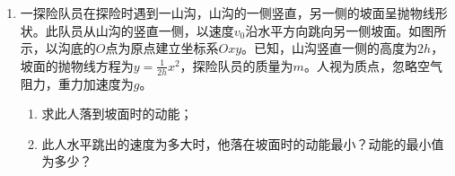 \documentclass[\gkver]{gaokaozhenti}
\begin{document}
\begin{enumerate}
{摆长为 $L$ 的单摆在地面处的摆动周期为 $T=2\pi\sqrt{\frac{L}{g}}$。

若该物体位于矿井底部，则其重力为 $mg'=G\frac{mM'}{(R-d)^{2}}$，式中 $g'$ 是矿井底部的重力加速度，且 $M'=\frac{4}{3}\pi\rho(R-d)^{3}$。在矿井底部此单摆的周期为 $T'=2\pi\sqrt{\frac{L}{g'}}$。

由题意 $T=kT'$，联立以上各式得 $d=R(1-k^{2})$。
}

\item
一探险队员在探险时遇到一山沟，山沟的一侧竖直，另一侧的坡面呈抛物线形状。此队员从山沟的竖直一侧，以速度$v_{0}$沿水平方向跳向另一侧坡面。如图所示，以沟底的$O$点为原点建立坐标系$Oxy$。已知，山沟竖直一侧的高度为$2h$，坡面的抛物线方程为$y=\frac{1}{2h}x^{2}$，探险队员的质量为$m$。人视为质点，忽略空气阻力，重力加速度为$g$。
\begin{enumerate}
	\item
	求此人落到坡面时的动能；
	\item
	此人水平跳出的速度为多大时，他落在坡面时的动能最小？动能的最小值为多少？
\end{enumerate}

\end{enumerate}
\end{document}
